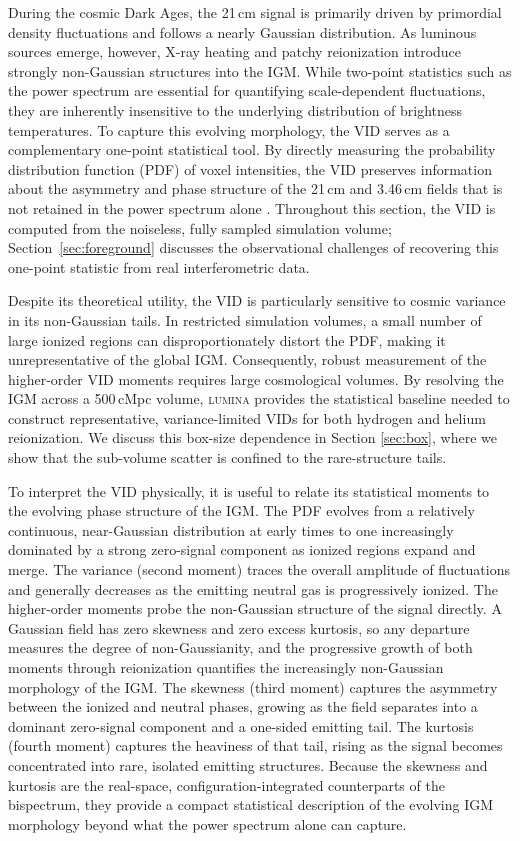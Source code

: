 \documentclass[apj,twocolumn, appendixfloats, twocolappendix, numberedappendix, tighten]{openjournal}
\DeclareRobustCommand{\lumina}{\mbox{\textsc{lumina}}\xspace}
\begin{document}
During the cosmic Dark Ages, the 21\,cm signal is primarily driven by primordial density fluctuations and follows a nearly Gaussian distribution. As luminous sources emerge, however, X-ray heating and patchy reionization introduce strongly non-Gaussian structures into the IGM. While two-point statistics such as the power spectrum are essential for quantifying scale-dependent fluctuations, they are inherently insensitive to the underlying distribution of brightness temperatures. To capture this evolving morphology, the VID serves as a complementary one-point statistical tool. By directly measuring the probability distribution function (PDF) of voxel intensities, the VID preserves information about the asymmetry and phase structure of the 21\,cm and 3.46\,cm fields that is not retained in the power spectrum alone \citep{Breysse2017, Sabla2024}. Throughout this section, the VID is computed from the noiseless, fully sampled simulation volume; Section~\ref{sec:foreground} discusses the observational challenges of recovering this one-point statistic from real interferometric data.


Despite its theoretical utility, the VID is particularly sensitive to cosmic variance in its non-Gaussian tails. In restricted simulation volumes, a small number of large ionized regions can disproportionately distort the PDF, making it unrepresentative of the global IGM. Consequently, robust measurement of the higher-order VID moments requires large cosmological volumes. By resolving the IGM across a 500\,cMpc volume, \lumina provides the statistical baseline needed to construct representative, variance-limited VIDs for both hydrogen and helium reionization. We discuss this box-size dependence in Section \ref{sec:box}, where we show that the sub-volume scatter is confined to the rare-structure tails.


To interpret the VID physically, it is useful to relate its statistical moments to the evolving phase structure of the IGM. The PDF evolves from a relatively continuous, near-Gaussian distribution at early times to one increasingly dominated by a strong zero-signal component as ionized regions expand and merge. The variance (second moment) traces the overall amplitude of fluctuations and generally decreases as the emitting neutral gas is progressively ionized. The higher-order moments probe the non-Gaussian structure of the signal directly. A Gaussian field has zero skewness and zero excess kurtosis, so any departure measures the degree of non-Gaussianity, and the progressive growth of both moments through reionization quantifies the increasingly non-Gaussian morphology of the IGM. The skewness (third moment) captures the asymmetry between the ionized and neutral phases, growing as the field separates into a dominant zero-signal component and a one-sided emitting tail. The kurtosis (fourth moment) captures the heaviness of that tail, rising as the signal becomes concentrated into rare, isolated emitting structures. Because the skewness and kurtosis are the real-space, configuration-integrated counterparts of the bispectrum, they provide a compact statistical description of the evolving IGM morphology beyond what the power spectrum alone can capture.
\end{document}
